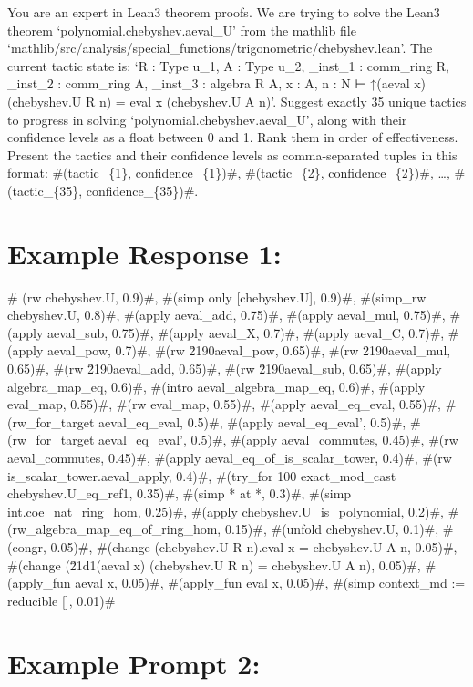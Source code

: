 \documentclass[
]{article}
\begin{document}
You are an expert in Lean3 theorem proofs. We are trying to solve the
Lean3 theorem `polynomial.chebyshev.aeval\_U' from the mathlib file
`mathlib/src/analysis/special\_functions/trigonometric/chebyshev.lean'.
The current tactic state is: `R : Type u\_1, A : Type u\_2, \_inst\_1 :
comm\_ring R, \_inst\_2 : comm\_ring A, \_inst\_3 : algebra R A, x : A,
n : N ⊢ ↑(aeval x) (chebyshev.U R n) = eval x (chebyshev.U A n)'.
Suggest exactly 35 unique tactics to progress in solving
`polynomial.chebyshev.aeval\_U', along with their confidence levels as a
float between 0 and 1. Rank them in order of effectiveness. Present the
tactics and their confidence levels as comma-separated tuples in this
format: \#(tactic\_\{1\}, confidence\_\{1\})\#, \#(tactic\_\{2\},
confidence\_\{2\})\#, \ldots, \#(tactic\_\{35\}, confidence\_\{35\})\#.

\section{Example Response 1:}\label{example-response-1}

\# (rw chebyshev.U, 0.9)\#, \#(simp only {[}chebyshev.U{]}, 0.9)\#,
\#(simp\_rw chebyshev.U, 0.8)\#, \#(apply aeval\_add, 0.75)\#, \#(apply
aeval\_mul, 0.75)\#, \#(apply aeval\_sub, 0.75)\#, \#(apply aeval\_X,
0.7)\#, \#(apply aeval\_C, 0.7)\#, \#(apply aeval\_pow, 0.7)\#, \#(rw
\u2190aeval\_pow, 0.65)\#, \#(rw 2190aeval\_mul, 0.65)\#, \#(rw
\u2190aeval\_add, 0.65)\#, \#(rw \u2190aeval\_sub, 0.65)\#, \#(apply
algebra\_map\_eq, 0.6)\#, \#(intro aeval\_algebra\_map\_eq, 0.6)\#,
\#(apply eval\_map, 0.55)\#, \#(rw eval\_map, 0.55)\#, \#(apply
aeval\_eq\_eval, 0.55)\#, \#(rw\_for\_target aeval\_eq\_eval, 0.5)\#,
\#(apply aeval\_eq\_eval', 0.5)\#, \#(rw\_for\_target aeval\_eq\_eval',
0.5)\#, \#(apply aeval\_commutes, 0.45)\#, \#(rw aeval\_commutes,
0.45)\#, \#(apply aeval\_eq\_of\_is\_scalar\_tower, 0.4)\#, \#(rw
is\_scalar\_tower.aeval\_apply, 0.4)\#, \#(try\_for 100 exact\_mod\_cast
chebyshev.U\_eq\_ref1, 0.35)\#, \#(simp * at *, 0.3)\#, \#(simp
int.coe\_nat\_ring\_hom, 0.25)\#, \#(apply chebyshev.U\_is\_polynomial,
0.2)\#, \#(rw\_algebra\_map\_eq\_of\_ring\_hom, 0.15)\#, \#(unfold
chebyshev.U, 0.1)\#, \#(congr, 0.05)\#, \#(change (chebyshev.U R n).eval
x = chebyshev.U A n, 0.05)\#, \#(change (\u21d1(aeval x) (chebyshev.U R
n) = chebyshev.U A n), 0.05)\#, \#(apply\_fun aeval x, 0.05)\#,
\#(apply\_fun eval x, 0.05)\#, \#(simp context\_md := reducible {[}{]},
0.01)\#

\section{Example Prompt 2:}\label{example-prompt-2}
\end{document}
